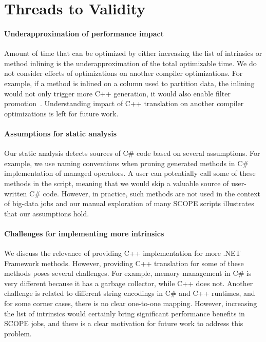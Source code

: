 \section{Threads to Validity}

\paragraph{Underapproximation of performance impact}
Amount of time that can be optimized by either increasing the list of intrinsics or method inlining is the underapproximation of the total optimizable time. We do not consider effects of optimizations on another compiler optimizations. For example, if a method is inlined on a column used to partition data, the inlining would not only trigger more C++ generation, it would also enable filter promotion~\cite{}. Understanding impact of C++ translation on another compiler optimizations is left for future work.

\paragraph{Assumptions for static analysis}
Our static analysis detects sources of C\# code based on several assumptions. For example, we use naming conventions when pruning generated methods in C\# implementation of managed operators. A user can potentially call some of these methods in the script, meaning that we would skip a valuable source of user-written C\# code. However, in practice, such methods are not used in the context of big-data jobs and our manual exploration of many SCOPE scripts illustrates that our assumptions hold.

\paragraph{Challenges for implementing more intrinsics}
We discuss the relevance of providing C++ implementation for more .NET Framework methods. However, providing C++ translation for some of these methods poses several challenges. For example, memory management in C\# is very different because it has a garbage collector, while C++ does not. Another challenge is related to different string encodings in C\# and C++ runtimes, and for some corner cases, there is no clear one-to-one mapping. However, increasing the list of intrinsics would certainly bring significant performance benefits in SCOPE jobs, and there is a clear motivation for future work to address this problem.  
